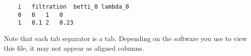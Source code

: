 \documentclass{article}
\begin{document}
\begin{verbatim}
    i   filtration  betti_0 lambda_0
    0   0   1   0
    1   0.1 2   0.23
\end{verbatim}

Note that each tab separator is a tab. Depending on the software you use to view this file, it may not appear as aligned columns.


\end{document}

